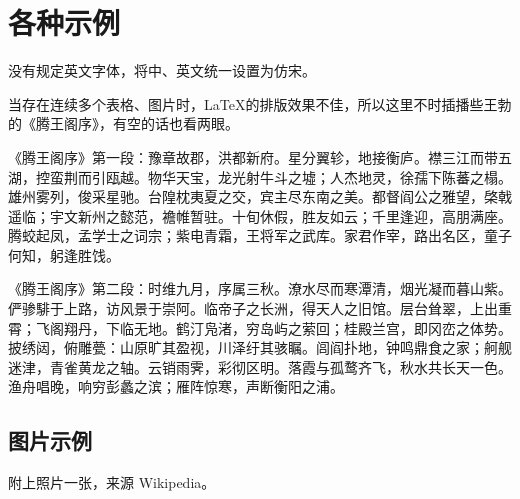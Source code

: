 \section{各种示例}

\zjubiaozhun 没有规定英文字体，\zjuthesis 将中、英文统一设置为仿宋。

当存在连续多个表格、图片时，\LaTeX 的排版效果不佳，所以这里不时插播些王勃的《腾王阁序》，有空的话也看两眼。

《腾王阁序》第一段：豫章故郡，洪都新府。星分翼轸，地接衡庐。襟三江而带五湖，控蛮荆而引瓯越。物华天宝，龙光射牛斗之墟；人杰地灵，徐孺下陈蕃之榻。雄州雾列，俊采星驰。台隍枕夷夏之交，宾主尽东南之美。都督阎公之雅望，棨戟遥临；宇文新州之懿范，襜帷暂驻。十旬休假，胜友如云；千里逢迎，高朋满座。腾蛟起凤，孟学士之词宗；紫电青霜，王将军之武库。家君作宰，路出名区，童子何知，躬逢胜饯。

《腾王阁序》第二段：时维九月，序属三秋。潦水尽而寒潭清，烟光凝而暮山紫。俨骖騑于上路，访风景于崇阿。临帝子之长洲，得天人之旧馆。层台耸翠，上出重霄；飞阁翔丹，下临无地。鹤汀凫渚，穷岛屿之萦回；桂殿兰宫，即冈峦之体势。披绣闼，俯雕甍：山原旷其盈视，川泽纡其骇瞩。闾阎扑地，钟鸣鼎食之家；舸舰迷津，青雀黄龙之轴。云销雨霁，彩彻区明。落霞与孤鹜齐飞，秋水共长天一色。渔舟唱晚，响穷彭蠡之滨；雁阵惊寒，声断衡阳之浦。

\subsection{图片示例}

附上照片一张，来源 Wikipedia。

